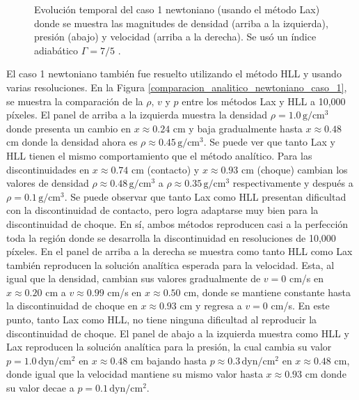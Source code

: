 \documentclass[12pt,a4paper]{book}
\begin{document}
\begin{figure}
      \caption{\label{caso_new_rar_shock} Evolución temporal del caso 1 newtoniano (usando el método Lax) donde se muestra
      las magnitudes de densidad (arriba a la izquierda), presión (abajo) y 
      velocidad (arriba a la derecha). 
      Se usó un índice adiabático $\Gamma = 7/5$ .}
  \end{figure}

  El caso 1 newtoniano también fue resuelto utilizando el método HLL y usando varias resoluciones. 
  En la Figura 
  \ref{comparacion_analitico_newtoniano_caso_1}, se muestra la comparación de la $\rho, \, v$ y $p$
  entre los métodos Lax 
  y HLL a 10,000 píxeles. 
  El panel de arriba a la izquierda muestra la densidad $\rho = 1.0 \,  \text{g}/ \text{cm}^3$ 
  donde presenta un cambio en 
  $x \approx 0.24 $ cm y baja gradualmente hasta $x \approx 0.48$ cm donde la densidad ahora es $\rho \approx
  0.45 \,  \text{g}/ \text{cm}^3$. Se puede ver que tanto Lax y HLL tienen el 
  mismo comportamiento
  que el método analítico. 
  Para las discontinuidades en $x \approx 0.74$ cm (contacto) y $x \approx 0.93$ cm (choque) cambian los valores de densidad $
  \rho \approx 0.48 \,  \text{g}/ \text{cm}^3$ a $\rho \approx 0.35 \,  \text{g}/ \text{cm}^3$ respectivamente y 
  después a $\rho =0.1 \,  \text{g}/ \text{cm}^3$. 
  Se puede observar que
  tanto Lax como HLL presentan dificultad con la discontinuidad de contacto, 
  pero logra adaptarse muy bien para la discontinuidad de choque. En sí, ambos métodos reproducen 
  casi a 
  la perfección toda la región donde se desarrolla la discontinuidad en resoluciones de 10,000 píxeles.
  En el panel de arriba a la derecha se muestra como tanto HLL como Lax también reproducen la 
  solución analítica esperada para
  la velocidad. Esta, al igual que la densidad, cambian 
  sus valores gradualmente de $v = 0$ cm/s en $x \approx 0.20$ cm a $v \approx 0.99$ cm/s en 
  $x \approx 0.50$ cm,
  donde se mantiene constante hasta la discontinuidad de choque en $x \approx 0.93$ cm y regresa a $v = 0$ cm/s.
  En este punto, tanto Lax como HLL, no tiene ninguna dificultad al reproducir la discontinuidad de 
  choque.
  El panel de abajo a la izquierda muestra como HLL y Lax reproducen la solución 
  analítica para
  la presión, la cual cambia su valor 
  $p = 1.0 \,  \text{dyn}/ \text{cm}^2 $ en $x \approx 0.48$ cm
  bajando hasta $p \approx 0.3 \,  \text{dyn}/ \text{cm}^2 $ en $x \approx 0.48$ cm, 
  donde igual que la velocidad
  mantiene su mismo valor hasta $x \approx 0.93$ cm donde su valor decae a $p = 0.1 \,  \text{dyn}/ \text{cm}^2 $.
\end{document}
